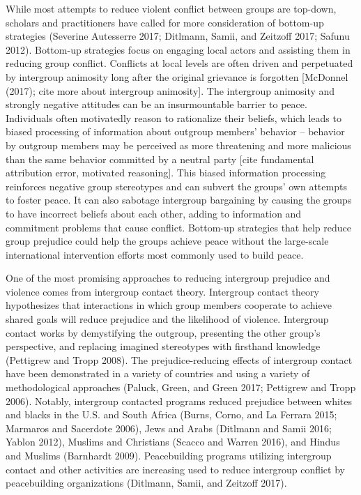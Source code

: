 \documentclass[11pt]{article}
\begin{document}
While most attempts to reduce violent conflict between groups are
top-down, scholars and practitioners have called for more consideration
of bottom-up strategies (Severine Autesserre 2017; Ditlmann, Samii, and
Zeitzoff 2017; Safunu 2012). Bottom-up strategies focus on engaging
local actors and assisting them in reducing group conflict. Conflicts at
local levels are often driven and perpetuated by intergroup animosity
long after the original grievance is forgotten {[}McDonnel (2017); cite
more about intergroup animosity{]}. The intergroup animosity and
strongly negative attitudes can be an insurmountable barrier to peace.
Individuals often motivatedly reason to rationalize their beliefs, which
leads to biased processing of information about outgroup members'
behavior -- behavior by outgroup members may be perceived as more
threatening and more malicious than the same behavior committed by a
neutral party {[}cite fundamental attribution error, motivated
reasoning{]}. This biased information processing reinforces negative
group stereotypes and can subvert the groups' own attempts to foster
peace. It can also sabotage intergroup bargaining by causing the groups
to have incorrect beliefs about each other, adding to information and
commitment problems that cause conflict. Bottom-up strategies that help
reduce group prejudice could help the groups achieve peace without the
large-scale international intervention efforts most commonly used to
build peace.

One of the most promising approaches to reducing intergroup prejudice
and violence comes from intergroup contact theory. Intergroup contact
theory hypothesizes that interactions in which group members cooperate
to achieve shared goals will reduce prejudice and the likelihood of
violence. Intergroup contact works by demystifying the outgroup,
presenting the other group's perspective, and replacing imagined
stereotypes with firsthand knowledge (Pettigrew and Tropp 2008). The
prejudice-reducing effects of intergroup contact have been demonstrated
in a variety of countries and using a variety of methodological
approaches (Paluck, Green, and Green 2017; Pettigrew and Tropp 2006).
Notably, intergroup contacted programs reduced prejudice between whites
and blacks in the U.S. and South Africa (Burns, Corno, and La Ferrara
2015; Marmaros and Sacerdote 2006), Jews and Arabs (Ditlmann and Samii
2016; Yablon 2012), Muslims and Christians (Scacco and Warren 2016), and
Hindus and Muslims (Barnhardt 2009). Peacebuilding programs utilizing
intergroup contact and other activities are increasing used to reduce
intergroup conflict by peacebuilding organizations (Ditlmann, Samii, and
Zeitzoff 2017).
\end{document}
